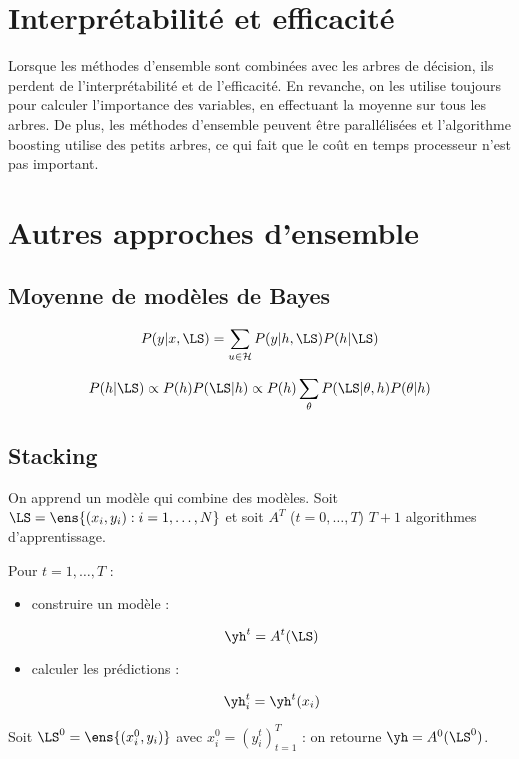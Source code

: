 \section{Interprétabilité et efficacité}
	
Lorsque les méthodes d'ensemble sont combinées avec les arbres de décision, ils perdent de l'interprétabilité et de l'efficacité. En revanche, on les utilise toujours pour calculer l'importance des variables, en effectuant la moyenne sur tous les arbres. De plus, les méthodes d'ensemble peuvent être parallélisées et l'algorithme boosting utilise des petits arbres, ce qui fait que le coût en temps processeur n'est pas important.
		
	
\section{Autres approches d'ensemble}

	\subsection{Moyenne de modèles de Bayes}
	$$P(y \vert x, \LS) = \sum_{u \in \mathcal{H}} P(y \vert h, \LS) P(h \vert \LS)$$
	
	$$P(h \vert \LS) \propto P(h) P(\LS \vert h) \propto P(h) \sum_\theta P(\LS \vert \theta, h) P(\theta \vert h)$$
	
	\subsection{Stacking}
	
	On apprend un modèle qui combine des modèles. Soit $\LS = \ens{(x_i, y_i) : i = 1, \dots , N}$ et soit $A^T$ ($t = 0, \dots , T$) $T + 1$ algorithmes d'apprentissage.
	
	Pour $t = 1, \dots , T$ :
	
	\begin{itemize}
		\item construire un modèle :
		
		$$\yh^t = A^t(\LS)$$
		
		\item calculer les prédictions :
		
		$$\yh_i^t = \yh^t (x_i)$$
	\end{itemize}
	
	Soit $\LS^0 = \ens{(x_i^0, y_i)}$ avec $x_i^0 = (y_i^t)^T_{t = 1}$ : on retourne $\yh = A^0(\LS^0)$.
	
